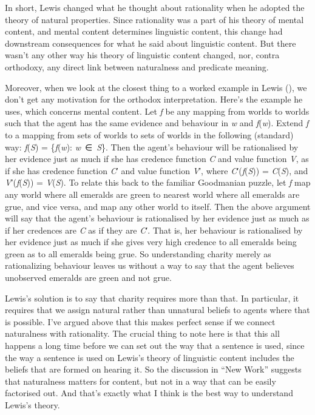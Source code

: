 \documentclass[
  10pt,
  letterpaper,
  DIV=11,
  numbers=noendperiod,
  twoside]{scrartcl}
\begin{document}
In short, Lewis changed what he thought about rationality when he
adopted the theory of natural properties. Since rationality was a part
of his theory of mental content, and mental content determines
linguistic content, this change had downstream consequences for what he
said about linguistic content. But there wasn't any other way his theory
of linguistic content changed, nor, contra orthodoxy, any direct link
between naturalness and predicate meaning.

Moreover, when we look at the closest thing to a worked example in Lewis
(), we don't get any motivation for the
orthodox interpretation. Here's the example he uses, which concerns
mental content. Let \emph{f} be any mapping from worlds to worlds such
that the agent has the same evidence and behaviour in \emph{w} and
\emph{f}(\emph{w}). Extend \emph{f} to a mapping from sets of worlds to
sets of worlds in the following (standard) way: \emph{f}(\emph{S}) =
\{\emph{f}(\emph{w}): \emph{w}~∈~\emph{S}\}. Then the agent's behaviour
will be rationalised by her evidence just as much if she has credence
function \emph{C} and value function \emph{V}, as if she has credence
function \emph{C}′ and value function \emph{V}′, where
\emph{C}′(\emph{f}(\emph{S})) = \emph{C}(\emph{S}), and
\emph{V}′(\emph{f}(\emph{S})) = \emph{V}(\emph{S}). To relate this back
to the familiar Goodmanian puzzle, let \emph{f} map any world where all
emeralds are green to nearest world where all emeralds are grue, and
vice versa, and map any other world to itself. Then the above argument
will say that the agent's behaviour is rationalised by her evidence just
as much as if her credences are \emph{C} as if they are \emph{C}′. That
is, her behaviour is rationalised by her evidence just as much if she
gives very high credence to all emeralds being green as to all emeralds
being grue. So understanding charity merely as rationalizing behaviour
leaves us without a way to say that the agent believes unobserved
emeralds are green and not grue.

Lewis's solution is to say that charity requires more than that. In
particular, it requires that we assign natural rather than unnatural
beliefs to agents where that is possible. I've argued above that this
makes perfect sense if we connect naturalness with rationality. The
crucial thing to note here is that this all happens a long time before
we can set out the way that a sentence is used, since the way a sentence
is used on Lewis's theory of linguistic content includes the beliefs
that are formed on hearing it. So the discussion in ``New Work''
suggests that naturalness matters for content, but not in a way that can
be easily factorised out. And that's exactly what I think is the best
way to understand Lewis's theory.
\end{document}
